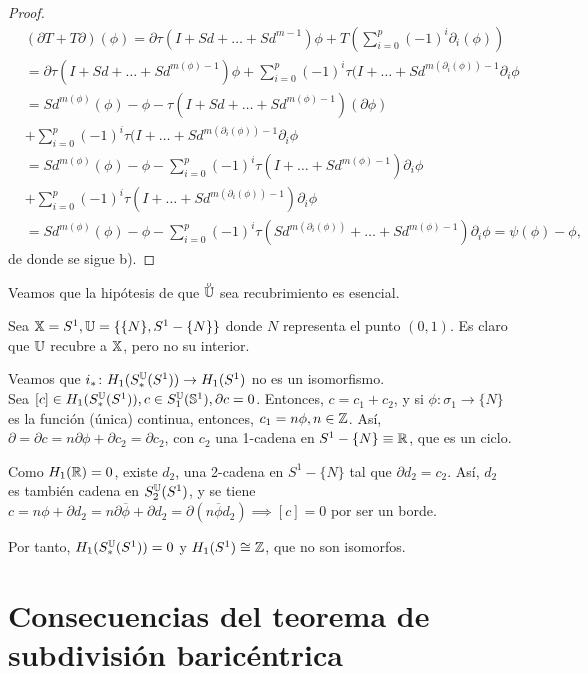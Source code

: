\begin{proof}
  \begin{align*}
    &(\partial T + T \partial)(\phi) = \partial \tau(I + Sd + \dots + Sd^{m-1}) \phi + T(\sum\limits_{i = 0}^p (-1)^i \partial_i(\phi)) \\
    &= \partial \tau(I + Sd + \dots + Sd^{m(\phi)-1}) \phi + \sum\limits_{i = 0}^p (-1)^i \tau(I + \dots + Sd^{m(\partial_i(\phi)) - 1} \partial_i \phi \\
    &= Sd^{m(\phi)}(\phi) - \phi - \tau(I + Sd + \dots + Sd^{m(\phi)-1})(\partial \phi)  \\
    &+ \sum\limits_{i = 0}^p (-1)^i \tau(I + \dots + Sd^{m(\partial_i(\phi)) - 1} \partial_i \phi \\
    &= Sd^{m(\phi)}(\phi) - \phi - \sum\limits_{i = 0}^p (-1)^i \tau(I + \dots + Sd^{m(\phi) - 1}) \partial_i \phi \\
    &+ \sum\limits_{i = 0}^p (-1)^i \tau(I + \dots + Sd^{m(\partial_i(\phi)) - 1}) \partial_i \phi \\
    &= Sd^{m(\phi)}(\phi) - \phi - \sum\limits_{i = 0}^p (-1)^i \tau(Sd^{m(\partial_i(\phi))} + \dots + Sd^{m(\phi) - 1}) \partial_i \phi = \psi(\phi) - \phi,
  \end{align*}
  de donde se sigue b).
\end{proof}

Veamos que la hipótesis de que $\interior{\U}$ sea recubrimiento es esencial.

Sea ${\mathbb X} = S^1, {\mathbb U} = \{\{N\}, S^1 - \{N\}\}$ donde $N$ representa el punto $(0, 1)$. Es claro que ${\mathbb U}$ recubre a ${\mathbb X}$, pero no su interior.

Veamos que $i_* \colon H_1(S_*^{\mathbb U}(S^1)) \to H_1(S^1)$ no es un isomorfismo. \\
Sea $[c] \in H_1(S_*^{\mathbb U}(S^1)), c \in S_1^{\mathbb U}({\mathbb S}^1), \partial c = 0$. Entonces, $c = c_1 + c_2$, y si $\phi \colon \sigma_1 \to \{N\}$ es la función
(única) continua, entonces, $c_1 = n\phi, n \in \mathbb{Z}$. Así, $\partial = \partial c = n \partial \phi + \partial c_2 = \partial c_2$, con $c_2$ una
1-cadena en $S^1 - \{N\} \equiv \mathbb{R}$, que es un ciclo.

Como $H_1(\mathbb{R}) = 0$, existe $d_2$, una 2-cadena en $S^1 - \{N\}$ tal que $\partial d_2 = c_2$. Así, $d_2$ es también cadena en $S_2^{\mathbb U}(S^1)$, y se tiene
$c = n\phi + \partial d_2 = n \partial \overline{\phi} + \partial d_2 = \partial(n\overline{\phi}  d_2) \implies [c] = 0$ por ser un borde.

Por tanto, $H_1(S_*^{\mathbb U}(S^1)) = 0$ y $H_1(S^1) \cong \mathbb{Z}$, que no son isomorfos.

\section{Consecuencias del teorema de subdivisión baricéntrica}

